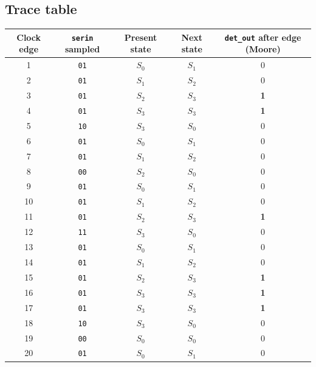 \documentclass[10pt,a4paper]{article}
\begin{document}
\subsection{Trace table}
\begin{center}\small
\begin{tabular}{c c c c c}
\toprule
Clock edge & \texttt{serin} sampled & Present state & Next state & \texttt{det\_out} {\scriptsize after edge (Moore)}\\
\midrule
1 & \texttt{01} & $S_{0}$ & $S_{1}$ & 0\\
2 & \texttt{01} & $S_{1}$ & $S_{2}$ & 0\\
\rowcolor{red!12}3 & \texttt{01} & $S_{2}$ & $S_{3}$ & \textbf{1}\\
\rowcolor{red!12}4 & \texttt{01} & $S_{3}$ & $S_{3}$ & \textbf{1}\\
5 & \texttt{10} & $S_{3}$ & $S_{0}$ & 0\\
6 & \texttt{01} & $S_{0}$ & $S_{1}$ & 0\\
7 & \texttt{01} & $S_{1}$ & $S_{2}$ & 0\\
8 & \texttt{00} & $S_{2}$ & $S_{0}$ & 0\\
9 & \texttt{01} & $S_{0}$ & $S_{1}$ & 0\\
10 & \texttt{01} & $S_{1}$ & $S_{2}$ & 0\\
\rowcolor{red!12}11 & \texttt{01} & $S_{2}$ & $S_{3}$ & \textbf{1}\\
12 & \texttt{11} & $S_{3}$ & $S_{0}$ & 0\\
13 & \texttt{01} & $S_{0}$ & $S_{1}$ & 0\\
14 & \texttt{01} & $S_{1}$ & $S_{2}$ & 0\\
\rowcolor{red!12}15 & \texttt{01} & $S_{2}$ & $S_{3}$ & \textbf{1}\\
\rowcolor{red!12}16 & \texttt{01} & $S_{3}$ & $S_{3}$ & \textbf{1}\\
\rowcolor{red!12}17 & \texttt{01} & $S_{3}$ & $S_{3}$ & \textbf{1}\\
18 & \texttt{10} & $S_{3}$ & $S_{0}$ & 0\\
19 & \texttt{00} & $S_{0}$ & $S_{0}$ & 0\\
20 & \texttt{01} & $S_{0}$ & $S_{1}$ & 0\\
\bottomrule
\end{tabular}\end{center}
\end{document}
